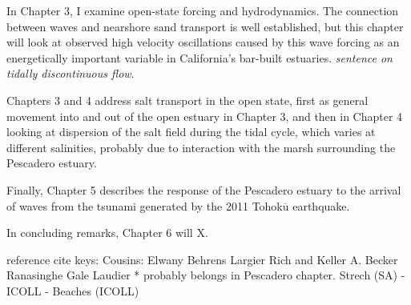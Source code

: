 In Chapter 3, I examine open-state forcing and hydrodynamics. The connection between waves and nearshore sand transport is well established, but this chapter will look at observed high velocity oscillations caused by this wave forcing as an energetically important variable in California's bar-built estuaries. \emph{sentence on tidally discontinuous flow}. 

Chapters 3 and 4 address salt transport in the open state, first as general movement into and out of the open estuary in Chapter 3, and then in Chapter 4 looking at dispersion of the salt field during the tidal cycle, which varies at different salinities, probably due to interaction with the marsh surrounding the Pescadero estuary.

Finally, Chapter 5 describes the response of the Pescadero estuary to the arrival of waves from the tsunami generated by the 2011 Tohok$\overline{\mathrm{u}}$ earthquake. 

In concluding remarks, Chapter 6 will X. 











reference cite keys:
Cousins: \cite{cousins_effects_2010,cousins_hydrodynamics_2011}
Elwany \cite{elwany_opening_1998}
Behrens \cite{behrens_characterization_2009,behrens_episodic_2013}
Largier \cite{largier_structure_1986,slinger_evolution_1990,largier_circulation_1991,largier_dynamics_1991,largier_stratified_1992,largier_tidal_1992,largier_seasonally_1997}
Rich and Keller \cite{rich_hydrologic_2013}
A. Becker \cite{becker_artificial_2009}
Ranasinghe \cite{ranasinghe_flushing_1998,ranasinghe_circulation_1999,ranasinghe_morphodynamic_1999,ranasinghe_seasonal_2003}
Gale \cite{gale_vertical_2006,gale_processes_2007}
Laudier \cite{laudier_measured_2011} * probably belongs in Pescadero chapter.
Strech (SA) - \cite{stretch_breaching_2006,parkinson_breaching_2007}
ICOLL - \cite{haines_morphometric_2006,baldock_morphodynamic_2008,davidson_simple_2009}
\cite{uncles_infragravity_2014}
Beaches (ICOLL)  \cite{weir_beach_2006}







